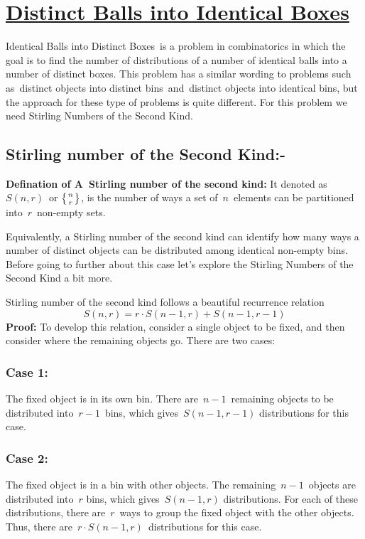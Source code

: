 \documentclass[12pt]{article}
\begin{document}
\section{\underline{Distinct Balls into Identical Boxes}}
Identical Balls into Distinct Boxes is a problem in combinatorics in which the goal is to find the number of distributions of a number of identical balls into a number of distinct boxes. This problem has a similar wording to problems such as distinct objects into distinct bins and distinct objects into identical bins, but the approach for these type of problems is quite different. For this problem we need Stirling Numbers of the Second Kind.
\subsection{Stirling number of the Second Kind:-}
\textbf{Defination of A Stirling number of the second kind:} It denoted as $S(n,r)$ \linebreak or $\left\{n \atop r\right\}$, is the number of ways a set of $n$ elements can be partitioned into $r$ non-empty sets.

 Equivalently, a Stirling number of the second kind can identify how many ways a number of distinct objects can be distributed among identical non-empty bins. Before going to further about this case let's explore the Stirling Numbers of the Second Kind a bit more.

Stirling number of the second kind follows a beautiful recurrence relation $$S (n,r)=r\cdot S (n-1,r)+ S (n-1,r-1)$$\textbf{Proof:} To develop this relation, consider a single object to be fixed, and then consider where the remaining objects go. There are two cases:
\subsubsection{Case 1:} The fixed object is in its own bin. There are $n-1$ remaining objects to be distributed into $r - 1$ bins, which gives $S(n-1, r - 1 )$ distributions for this case.
\subsubsection{Case 2:} The fixed object is in a bin with other objects. The remaining $n-1$ objects are distributed into $r$ bins, which gives $S(n-1,r)$ distributions. For each of these distributions, there are $r$ ways to group the fixed object with the other objects. Thus, there are $r\cdot S ( n-1, r )$ distributions for this case.
\end{document}
